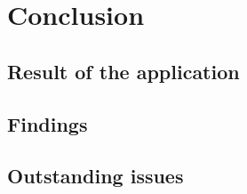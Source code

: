%
% 

\chapter{Conclusion}
\label{Conclusion and outlook}

\section{Result of the application}

\section{Findings}

\section{Outstanding issues}
